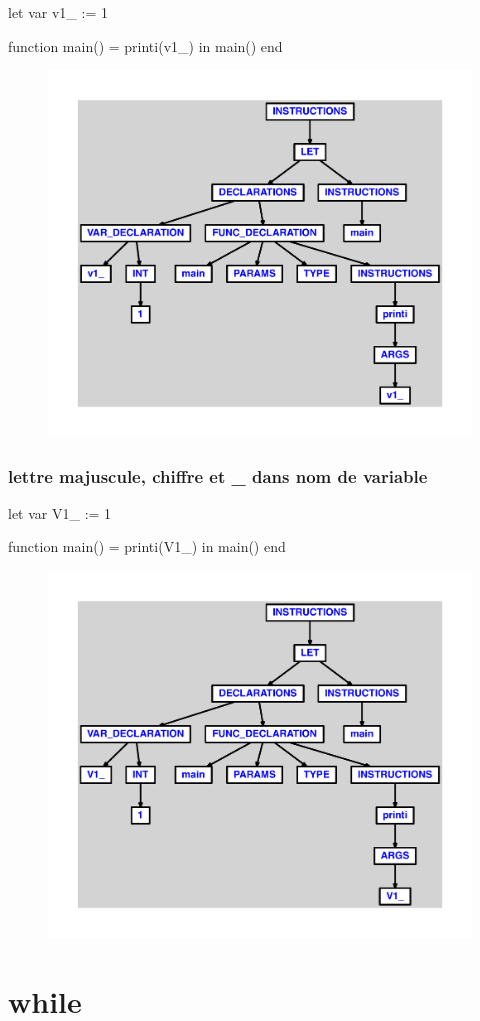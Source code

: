 \documentclass{article}
\begin{document}
\begin{verbatimtab}
let
	var v1_ := 1

	function main() = printi(v1_)
in main() end
\end{verbatimtab}
\begin{figure}[H]\centering\includegraphics[max width=\textwidth]{ast/ast_312.pdf}\end{figure}\subsubsection{lettre majuscule, chiffre et \_ dans nom de variable}
\begin{verbatimtab}
let
	var V1_ := 1

	function main() = printi(V1_)
in main() end
\end{verbatimtab}
\begin{figure}[H]\centering\includegraphics[max width=\textwidth]{ast/ast_313.pdf}\end{figure}\section{while}
\end{document}
